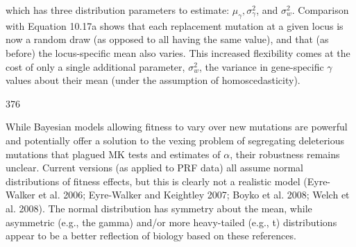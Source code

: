 \documentclass{article}
\begin{document}
which has three distribution parameters to estimate:  $ \mu_{\gamma}, \sigma_{\gamma}^{2} $, and  $ \sigma_{w}^{2} $. Comparison with Equation 10.17a shows that each replacement mutation at a given locus is now a random draw (as opposed to all having the same value), and that (as before) the locus-specific mean also varies. This increased flexibility comes at the cost of only a single additional parameter,  $ \sigma_{w}^{2} $, the variance in gene-specific  $ \gamma $ values about their mean (under the assumption of homoscedasticity).

376

While Bayesian models allowing fitness to vary over new mutations are powerful and potentially offer a solution to the vexing problem of segregating deleterious mutations that plagued MK tests and estimates of  $ \alpha $, their robustness remains unclear. Current versions (as applied to PRF data) all assume normal distributions of fitness effects, but this is clearly not a realistic model (Eyre-Walker et al. 2006; Eyre-Walker and Keightley 2007; Boyko et al. 2008; Welch et al. 2008). The normal distribution has symmetry about the mean, while asymmetric (e.g., the gamma) and/or more heavy-tailed (e.g., t) distributions appear to be a better reflection of biology based on these references.
\end{document}
